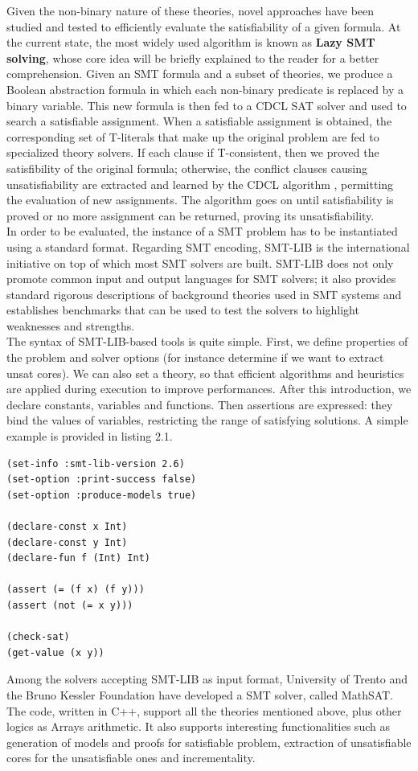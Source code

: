 Given the non-binary nature of these theories, novel approaches have been studied and tested to efficiently evaluate the satisfiability of a given formula. At the current state, the most widely used algorithm is known as \textbf{Lazy SMT solving}\cite{lazysmt}, whose core idea will be briefly explained to the reader for a better comprehension. Given an SMT formula and a subset of theories, we produce a Boolean abstraction formula in which each non-binary predicate is replaced by a binary variable. This new formula is then fed to a CDCL SAT solver and used to search a satisfiable assignment. When a satisfiable assignment is obtained, the corresponding set of T-literals that make up the original problem are fed to specialized theory solvers. If each clause if T-consistent, then we proved the satisfibility of the original formula; otherwise, the conflict clauses causing unsatisfiability are extracted and learned by the CDCL algorithm , permitting the evaluation of new assignments. The algorithm goes on until satisfiability is proved or no more assignment can be returned, proving its unsatisfiability. \\
In order to be evaluated, the instance of a SMT problem has to be instantiated using a standard format. Regarding SMT encoding, SMT-LIB is the international initiative on top of which most SMT solvers are built. SMT-LIB does not only promote common input and output languages for SMT solvers; it also provides standard rigorous descriptions of background theories used in SMT systems and establishes benchmarks that can be used to test the solvers to highlight weaknesses and strengths. \\
The syntax of SMT-LIB-based tools is quite simple. First, we define properties of the problem and solver options (for instance determine if we want to extract unsat cores). We can also set a theory, so that efficient algorithms and heuristics are applied during execution to improve performances. After this introduction, we declare constants, variables and functions. Then assertions are expressed: they bind the values of variables, restricting the range of satisfying solutions. A simple example is provided in listing 2.1. \\
\begin{lstlisting}[style=interfaces,caption=An example of SMT-LIB encoding.]
(set-info :smt-lib-version 2.6)
(set-option :print-success false)
(set-option :produce-models true)

(declare-const x Int)
(declare-const y Int)
(declare-fun f (Int) Int)

(assert (= (f x) (f y)))
(assert (not (= x y)))

(check-sat)
(get-value (x y))
\end{lstlisting}
Among the solvers accepting SMT-LIB as input format, University of Trento and the Bruno Kessler Foundation have developed a SMT solver, called MathSAT. The code, written in C++, support all the theories mentioned above, plus other logics as Arrays arithmetic. It also supports interesting functionalities such as generation of models and proofs for satisfiable problem, extraction of unsatisfiable cores for the unsatisfiable ones and incrementality.

